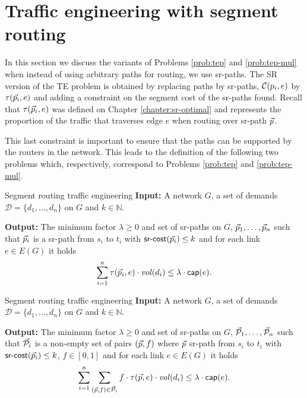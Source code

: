 \section{Traffic engineering with segment routing}

In this section we discuss the variants of Problems \ref{prob:tep} and \ref{prob:tep-mul} when
instead of using arbitrary paths for routing, we use sr-paths. The SR version of the TE problem is
obtained by replacing paths by sr-paths, $\mathcal{C}(p_i, e)$ by $\tau(\vec{p}_i, e)$ and adding a constraint on the segment cost of 
the sr-paths found. Recall that $\tau(\vec{p}_i, e)$ was defined on Chapter \ref{chapter:sr-optimal} and represents the 
proportion of the traffic that traverses edge $e$ when routing over sr-path $\vec{p}$.

This last constraint is important to ensure that the paths can be supported by the routers in the network.
This leads to the definition of the following two problems which, respectively, correspond to Problems \ref{prob:tep} and \ref{prob:tep-mul}.

\begin{problem}{Segment routing traffic engineering}
\label{prob:srte}
\textbf{Input:} A network $G$, a set of demands $\mathcal{D} = \{d_1, \ldots, d_n\}$ on $G$ and $k \in \mathbb{N}$.

\textbf{Output:} The minimum factor $\lambda \geq 0$ and set of sr-paths on $G$, $\vec{p}_1, \ldots, \vec{p}_n$ such that $\vec{p}_i$ is a 
sr-path from $s_i$ to $t_i$ with $\textsf{sr-cost}(\vec{p}_i) \leq k $ and for each link $e \in E(G)$ it holds
$$
\sum_{i = 1}^n \tau(\vec{p}_i, e) \cdot \mathit{vol}(d_i) \leq \lambda \cdot \mathsf{cap}(e).
$$ 
\end{problem}

\begin{problem}{Segment routing traffic engineering}
\label{prob:srte-mul}
\textbf{Input:} A network $G$, a set of demands $\mathcal{D} = \{d_1, \ldots, d_n\}$ on $G$ and $k \in  \mathbb{N}$.

\textbf{Output:} The minimum factor $\lambda \geq 0$ and set of sr-paths on $G$, $\vec{\mathcal{P}}_1, \ldots, \vec{\mathcal{P}}_n$ such that
$\vec{\mathcal{P}}_i$ is a 
non-empty set of pairs $(\vec{p}, f)$ where $\vec{p}$ sr-path from $s_i$ to $t_i$ with $\textsf{sr-cost}(\vec{p}_i) \leq k $, $f \in [0, 1]$ and for each link $e \in E(G)$ it holds
$$
\sum_{i = 1}^n \sum_{(\vec{p}, f) \in \vec{\mathcal{P}}_i} f \cdot \tau(\vec{p}, e) \cdot \mathit{vol}(d_i) \leq \lambda \cdot \mathsf{cap}(e).
$$ 
\end{problem}

